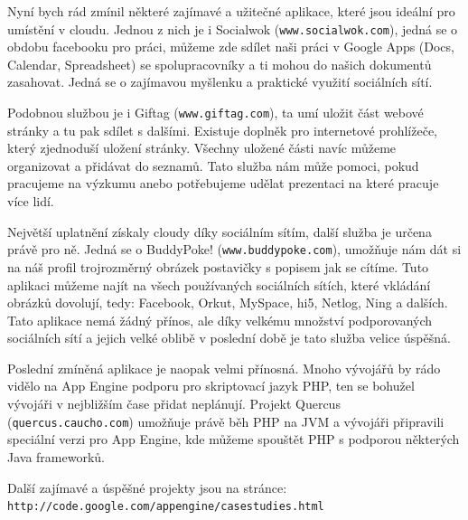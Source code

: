 Nyní bych rád zmínil některé zajímavé a užitečné aplikace, které jsou ideální pro umístění v cloudu. Jednou z nich je i Socialwok (\verb|www.socialwok.com|), jedná se o obdobu facebooku pro práci, můžeme zde sdílet naši práci v Google Apps (Docs, Calendar, Spreadsheet) se spolupracovníky a ti mohou do našich dokumentů zasahovat. Jedná se o zajímavou myšlenku a praktické využití sociálních sítí.

Podobnou službou je i Giftag (\verb|www.giftag.com|), ta umí uložit část webové stránky a tu pak sdílet s dalšími. Existuje doplněk pro internetové prohlížeče, který zjednoduší uložení stránky. Všechny uložené části navíc můžeme organizovat a přidávat do seznamů. Tato služba nám může pomoci, pokud pracujeme na výzkumu anebo potřebujeme udělat prezentaci na které pracuje více lidí.
 
Největší uplatnění získaly cloudy díky sociálním sítím, další služba je určena právě pro ně. Jedná se o BuddyPoke! (\verb|www.buddypoke.com|), umožňuje nám dát si na náš profil trojrozměrný obrázek postavičky s popisem jak se cítíme. Tuto aplikaci můžeme najít na všech používaných sociálních sítích, které vkládání obrázků dovolují, tedy: Facebook, Orkut, MySpace, hi5, Netlog, Ning a dalších. Tato aplikace nemá žádný přínos, ale díky velkému množství podporovaných sociálních sítí a jejich velké oblibě v poslední době je tato služba velice úspěšná.

Poslední zmíněná aplikace je naopak velmi přínosná. Mnoho vývojářů by rádo vidělo na App Engine podporu pro skriptovací jazyk PHP, ten se bohužel vývojáři v nejbližším čase přidat neplánují. Projekt Quercus (\verb|quercus.caucho.com|) umožňuje právě běh PHP na JVM a vývojáři připravili speciální verzi pro App Engine, kde můžeme spouštět PHP s podporou některých Java frameworků.

Další zajímavé a úspěšné projekty jsou na stránce: \verb|http://code.google.com/appengine/casestudies.html|

